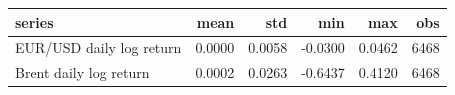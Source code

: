 \begin{tabular}{lrrrrr}
\toprule
series & mean & std & min & max & obs \\
\midrule
EUR/USD daily log return & 0.0000 & 0.0058 & -0.0300 & 0.0462 & 6468 \\
Brent daily log return & 0.0002 & 0.0263 & -0.6437 & 0.4120 & 6468 \\
\bottomrule
\end{tabular}
